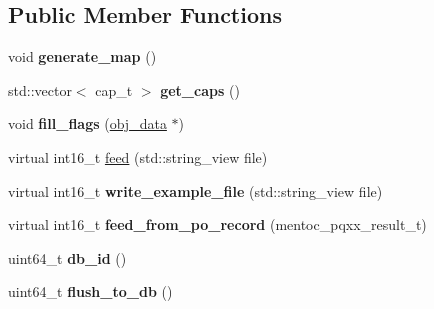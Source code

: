 \subsection*{Public Member Functions}
\begin{DoxyCompactItemize}
\item 
\mbox{\label{structmods_1_1yaml_1_1gadget__description__t_a3309d3c149725f10b8e4fc49924cc83a}} 
void {\bfseries generate\+\_\+map} ()
\item 
\mbox{\label{structmods_1_1yaml_1_1gadget__description__t_a757bff3fecc254666cac3b5d087224ab}} 
std\+::vector$<$ cap\+\_\+t $>$ {\bfseries get\+\_\+caps} ()
\item 
\mbox{\label{structmods_1_1yaml_1_1gadget__description__t_a7dbb3ddfe1c59ac05635a2e9df731b96}} 
void {\bfseries fill\+\_\+flags} (\hyperlink{structobj__data}{obj\+\_\+data} $\ast$)
\item 
virtual int16\+\_\+t \hyperlink{structmods_1_1yaml_1_1gadget__description__t_aeeed72fdc9b348de1fb71fbc1fb176a6}{feed} (std\+::string\+\_\+view file)
\item 
\mbox{\label{structmods_1_1yaml_1_1gadget__description__t_a3842ba73c65231624913f777ec8c4b8e}} 
virtual int16\+\_\+t {\bfseries write\+\_\+example\+\_\+file} (std\+::string\+\_\+view file)
\item 
\mbox{\label{structmods_1_1yaml_1_1gadget__description__t_a73b474214d1fbe58061a366a2539229a}} 
virtual int16\+\_\+t {\bfseries feed\+\_\+from\+\_\+po\+\_\+record} (mentoc\+\_\+pqxx\+\_\+result\+\_\+t)
\item 
\mbox{\label{structmods_1_1yaml_1_1gadget__description__t_a739429ac8d0a406145f28eda1f9ad2bb}} 
uint64\+\_\+t {\bfseries db\+\_\+id} ()
\item 
\mbox{\label{structmods_1_1yaml_1_1gadget__description__t_aabce4977dc70ed4af22e7c609c4c55b5}} 
uint64\+\_\+t {\bfseries flush\+\_\+to\+\_\+db} ()
\end{DoxyCompactItemize}
